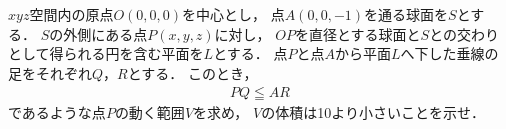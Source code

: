 \documentclass[../../main.tex]{subfiles}
\begin{document}
$xyz$空間内の原点$O(0,0,0)$を中心とし，
点$A(0,0,-1)$を通る球面を$S$とする．
$S$の外側にある点$P(x,y,z)$に対し，
$OP$を直径とする球面と$S$との交わりとして得られる円を含む平面を$L$とする．
点$P$と点$A$から平面$L$へ下した垂線の足をそれぞれ$Q$，$R$とする．
このとき，
\begin{align*}
  PQ \leqq AR
\end{align*}
であるような点$P$の動く範囲$V$を求め，
$V$の体積は10より小さいことを示せ．
\end{document}
